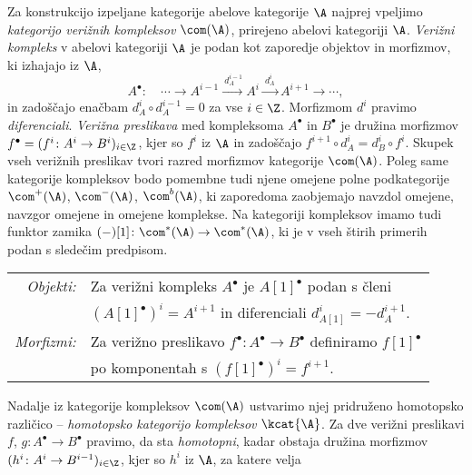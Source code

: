 Za konstrukcijo izpeljane kategorije abelove kategorije $\A$ najprej vpeljimo \emph{kategorijo verižnih kompleksov} $\com(\A)$, prirejeno abelovi kategoriji $\A$.
\emph{Verižni kompleks} v abelovi kategoriji $\A$ je podan kot zaporedje objektov in morfizmov, ki izhajajo iz $\A$,
\[
    A^\bullet : \quad \cdots \to A^{i-1} \xrightarrow{\ d_A^{i-1}} A^i \xrightarrow{\ d_A^{i} \ } A^{i+1} \to \cdots,
\] 
in zadoščajo enačbam $d_A^{i} \circ d_A^{i-1} = 0$ za vse $i \in \Z$. Morfizmom $d^i$ pravimo \emph{diferenciali}. \emph{Verižna preslikava} med kompleksoma $A^\bullet$ in $B^\bullet$ je družina morfizmov $f^\bullet = (f^i \colon A^i \to B^i)_{i \in \Z}$, kjer so $f^i$ iz $\A$ in zadoščajo $f^{i+1} \circ d^i_A = d^i_B \circ f^i$. Skupek vseh verižnih preslikav tvori razred morfizmov kategorije $\com(\A)$. Poleg same kategorije kompleksov bodo pomembne tudi njene omejene polne podkategorije $\com^+(\A)$, $\com^-(\A)$, $\com^b(\A)$, ki zaporedoma zaobjemajo navzdol omejene, navzgor omejene in omejene komplekse. Na kategoriji kompleksov imamo tudi funktor zamika $(-)[1] \colon \com^*(\A) \to \com^*(\A)$, ki je v vseh štirih primerih podan s sledečim predpisom.
\begin{center}
    \begin{tabular}{r l}
        \textsl{Objekti:} & Za verižni kompleks $A^\bullet$ je $A[1]^\bullet$ podan s členi \\ & $(A[1]^\bullet)^i = A^{i+1}$ in diferenciali $d^i_{A[1]} = - d^{i+1}_{A}$. \\
        \textsl{Morfizmi:} & Za verižno preslikavo $f^\bullet\colon A^\bullet \to B^\bullet$ definiramo $f[1]^\bullet$ \\ & po komponentah s $(f[1]^\bullet)^i = f^{i+1}$.
    \end{tabular}
\end{center}
Nadalje iz kategorije kompleksov $\com(\A)$ ustvarimo njej pridruženo homotopsko različico -- \emph{homotopsko kategorijo kompleksov} $\kcat{\A}$. Za dve verižni preslikavi $f$, $g \colon A^\bullet \to B^\bullet$ pravimo, da sta \emph{homotopni}, kadar obstaja družina morfizmov $(h^i \colon A^i \to B^{i-1})_{i \in\Z}$, kjer so $h^i$ iz $\A$, za katere velja
